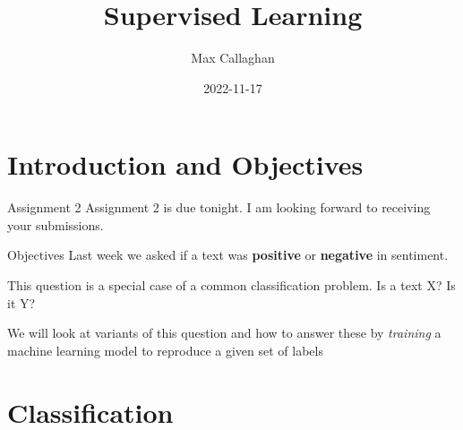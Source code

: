 \documentclass[
  10pt,
  ignorenonframetext,
  aspectratio=169]{beamer}
\title{Supervised Learning}
\author{Max Callaghan}
\date{2022-11-17}
\begin{document}
\frame{\titlepage}

\hypertarget{introduction-and-objectives}{%
\section{Introduction and
Objectives}\label{introduction-and-objectives}}

\begin{frame}{Assignment 2}
\protect\hypertarget{assignment-2}{}
Assignment 2 is due tonight. I am looking forward to receiving your
submissions.
\end{frame}

\begin{frame}{Objectives}
\protect\hypertarget{objectives}{}
Last week we asked if a text was \textbf{positive} or \textbf{negative}
in sentiment.

This question is a special case of a common classification problem. Is a
text X? Is it Y?

We will look at variants of this question and how to answer these by
\emph{training} a machine learning model to reproduce a given set of
labels
\end{frame}

\hypertarget{classification}{%
\section{Classification}\label{classification}}
\end{document}
